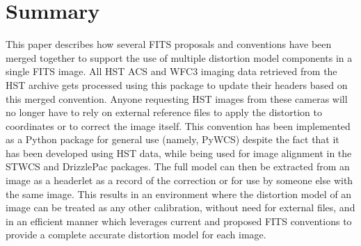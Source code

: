 \section{Summary}
This paper describes how several FITS proposals and conventions have been merged together to support the use of multiple distortion model components in a single FITS image.  All HST ACS and WFC3 imaging data retrieved from the HST archive gets processed using this package to update their headers based on this merged convention. Anyone requesting HST images from these cameras will no longer have to rely on external reference files to apply the distortion to coordinates or to correct the image itself. This convention has been implemented as a Python package for general use (namely, PyWCS) despite the fact that it has been developed using HST data, while being used for image alignment in the STWCS and DrizzlePac packages.  The full model can then be extracted from an image as a headerlet as a record of the correction or for use by someone else with the same image.  This results in an environment where the distortion model of an image can be treated as any other calibration, without need for external files, and in an efficient manner which leverages current and proposed FITS conventions to provide a complete accurate distortion model for each image.


